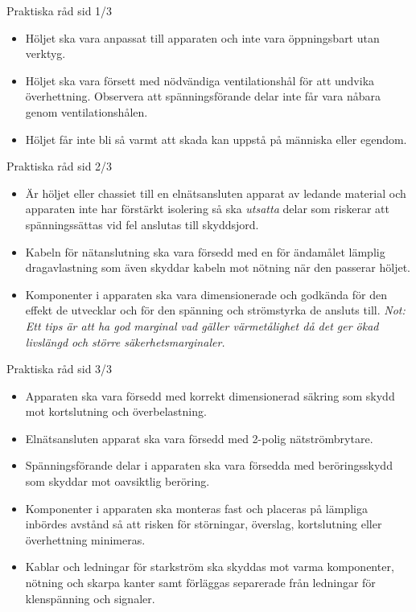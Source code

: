 \documentclass{beamer}
\begin{document}
\begin{frame}{Praktiska råd sid 1/3}
\begin{itemize}
	\item Höljet ska vara anpassat till apparaten och inte vara öppningsbart
	utan verktyg.

	\item Höljet ska vara försett med nödvändiga ventilationshål för att
	undvika överhettning.
	Observera att spänningsförande delar inte får vara nåbara genom
	ventilationshålen.

	\item Höljet får inte bli så varmt att skada kan uppstå på människa
	eller egendom.
\end{itemize}
\end{frame}

\begin{frame}{Praktiska råd sid 2/3}
\begin{itemize}
		\item Är höljet eller chassiet till en elnätsansluten apparat av ledande
	material och apparaten inte har förstärkt isolering så ska \emph{utsatta}
	delar som riskerar att spänningssättas vid fel anslutas till skyddsjord.

	\item Kabeln för nätanslutning ska vara försedd med en för ändamålet lämplig
	dragavlastning som även skyddar kabeln mot nötning när den passerar höljet.

	\item Komponenter i apparaten ska vara dimensionerade och godkända
	för den effekt de utvecklar och för den spänning och strömstyrka de
	ansluts till.
	\emph{Not: Ett tips är att ha god marginal vad gäller värmetålighet då det
		ger ökad livslängd och större säkerhetsmarginaler.}
\end{itemize}
\end{frame}

\begin{frame}{Praktiska råd sid 3/3}
\begin{itemize}
\item Apparaten ska vara försedd med korrekt dimensionerad säkring
som skydd mot kortslutning och överbelastning.

\item Elnätsansluten apparat ska vara försedd med 2-polig nätströmbrytare.

\item Spänningsförande delar i apparaten ska vara försedda med
beröringsskydd som skyddar mot oavsiktlig beröring.

\item Komponenter i apparaten ska monteras fast och placeras på lämpliga
inbördes avstånd så att risken för störningar, överslag, kortslutning eller
överhettning minimeras.

\item Kablar och ledningar för starkström ska skyddas mot varma komponenter,
nötning och skarpa kanter samt förläggas separerade från ledningar för
klenspänning och signaler.
\end{itemize}
\end{frame}
\end{document}
